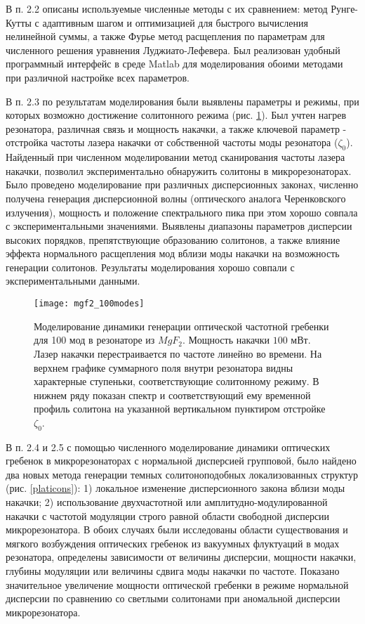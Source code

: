 В п. 2.2 описаны используемые численные методы с их сравнением: метод Рунге-Кутты с адаптивным шагом и оптимизацией для быстрого вычисления нелинейной суммы, а также Фурье метод расщепления по параметрам для численного решения уравнения Луджиато-Лефевера. Был реализован удобный программный интерфейс в среде Matlab для моделирования обоими методами при различной настройке всех параметров.

В п. 2.3 по результатам моделирования были выявлены параметры и режимы, при которых возможно достижение солитонного режима (рис. \ref{100modes}). Был учтен нагрев резонатора, различная связь и мощность накачки, а также ключевой параметр - отстройка частоты лазера накачки от собственной частоты моды резонатора ($\zeta_0$). Найденный при численном моделировании метод сканирования частоты лазера накачки, позволил экспериментально обнаружить солитоны в микрорезонаторах. Было проведено моделирование при различных дисперсионных законах, численно получена генерация дисперсионной волны (оптического аналога Черенковского излучения), мощность и положение спектрального пика при этом хорошо совпала с экспериментальными значениями. Выявлены диапазоны параметров дисперсии высоких порядков, препятствующие образованию солитонов, а также влияние эффекта нормального расщепления мод вблизи моды накачки на возможность генерации солитонов. Результаты моделирования хорошо совпали с экспериментальными данными.

\begin{figure}
  \centering
  \texttt{[image: mgf2\_100modes]}
  \caption{Моделирование динамики генерации оптической частотной гребенки для 100 мод в резонаторе из $MgF_2$. Мощность накачки $100$ мВт. Лазер накачки перестраивается по частоте линейно во времени. На верхнем графике суммарного поля внутри резонатора видны характерные ступеньки, соответствующие солитонному режиму. В нижнем ряду показан спектр и соответствующий ему временной профиль солитона на указанной вертикальном пунктиром отстройке $\zeta_0$.}
  \label{100modes}
\end{figure}

В п. 2.4 и 2.5 с помощью численного моделирование динамики оптических гребенок в микрорезонаторах с нормальной дисперсией групповой, было найдено два новых метода генерации темных солитоноподобных локализованных структур (рис. \ref{platicons}): 1) локальное изменение дисперсионного закона вблизи моды накачки; 2) использование двухчастотной или амплитудно-модулированной накачки с частотой модуляции строго равной области свободной дисперсии микрорезонатора. В обоих случаях были исследованы области существования и мягкого возбуждения оптических гребенок из вакуумных флуктуаций в модах резонатора, определены зависимости от величины дисперсии, мощности накачки, глубины модуляции или величины сдвига моды накачки по частоте. Показано значительное увеличение мощности оптической гребенки в режиме нормальной дисперсии по сравнению со светлыми солитонами при аномальной дисперсии микрорезонатора.

